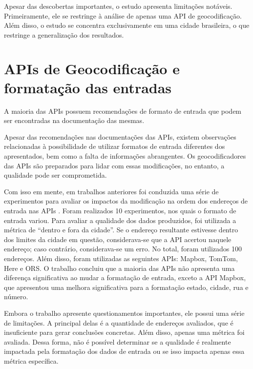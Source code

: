 Apesar das descobertas importantes, o estudo apresenta limitações notáveis. Primeiramente, ele se restringe à análise de apenas uma API de geocodificação. Além disso, o estudo se concentra exclusivamente em uma cidade brasileira, o que restringe a generalização dos resultados. 

\section{APIs de Geocodificação e  formatação das entradas}

A maioria das APIs possuem recomendações de formato de entrada que podem ser encontradas na documentação das mesmas. 

Apesar das recomendações nas documentações das APIs, existem observações relacionadas à possibilidade de utilizar formatos de entrada diferentes dos apresentados, bem como a falta de informações abrangentes. Os geocodificadores das APIs são preparados para lidar com essas modificações, no entanto, a qualidade pode ser comprometida.

Com isso em mente, em trabalhos anteriores \cite{terralab} foi conduzida uma série de experimentos para avaliar os impactos da modificação na ordem dos endereços de entrada nas APIs \cite{relatorioDeA}. Foram realizados 10 experimentos, nos quais o formato de entrada variou. Para avaliar a qualidade dos dados produzidos, foi utilizada a métrica de ``dentro e fora da cidade''. Se o endereço resultante estivesse dentro dos limites da cidade em questão, considerava-se que a API acertou naquele endereço; caso contrário, considerava-se um erro. No total, foram utilizados 100 endereços. Além disso, foram utilizadas as seguintes APIs: Mapbox, TomTom, Here e ORS. O trabalho concluiu que a maioria das APIs não apresenta uma diferença significativa ao mudar a formatação de entrada, exceto a API Mapbox, que apresentou uma melhora significativa para a formatação estado, cidade, rua e número.

Embora o trabalho apresente questionamentos importantes, ele possui uma série de limitações. A principal delas é a quantidade de endereços avaliados, que é insuficiente para gerar conclusões concretas. Além disso, apenas uma métrica foi avaliada. Dessa forma, não é possível determinar se a qualidade é realmente impactada pela formatação dos dados de entrada ou se isso impacta apenas essa métrica específica.
 
